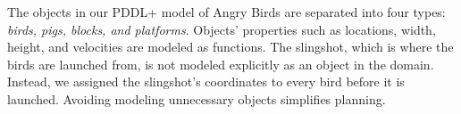 \documentclass[letterpaper]{article} %
\begin{document}
The objects in our PDDL+ model of Angry Birds are separated into four types: \textit{birds, pigs, blocks, and platforms}.
Objects' properties such as locations, width, height, and velocities are modeled as functions. %
The slingshot, which is where the birds are launched from, is not modeled explicitly as an object in the domain. Instead, we assigned the slingshot's coordinates to every bird before it is launched.
Avoiding modeling unnecessary objects
simplifies planning. %
\end{document}
